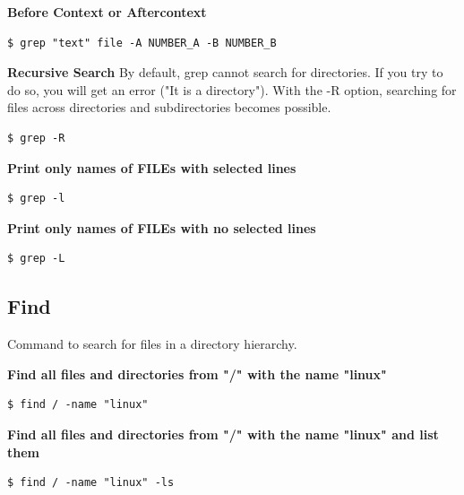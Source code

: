 \documentclass{article}
\newenvironment{codetemplate}[1][]{%
  \mybasecolorbox[#1]
  \itshape
}{%
  \endmybasecolorbox
}
\begin{document}
\textbf{Before Context or Aftercontext}
\begin{codetemplate}{}
\begin{verbatim}
$ grep "text" file -A NUMBER_A -B NUMBER_B
\end{verbatim}
\end{codetemplate}


\textbf{Recursive Search}
By default, grep cannot search for directories. If you try to do so, you will get an error ("It is a directory"). With the -R option, searching for files across directories and subdirectories becomes possible.
\begin{codetemplate}{}
\begin{verbatim}
$ grep -R
\end{verbatim}
\end{codetemplate}

\textbf{Print only names of FILEs with selected lines}
\begin{codetemplate}{}
\begin{verbatim}
$ grep -l
\end{verbatim}
\end{codetemplate}

\textbf{Print only names of FILEs with no selected lines}
\begin{codetemplate}{}
\begin{verbatim}
$ grep -L
\end{verbatim}
\end{codetemplate}


\subsection{Find}

Command to search for files in a directory hierarchy.


\textbf{Find all files and directories from "/" with the name "linux"}
\begin{codetemplate}{}
\begin{verbatim}
$ find / -name "linux"
\end{verbatim}
\end{codetemplate}

\textbf{Find all files and directories from "/" with the name "linux" and list them}
\begin{codetemplate}{}
\begin{verbatim}
$ find / -name "linux" -ls
\end{verbatim}
\end{codetemplate}
\end{document}
